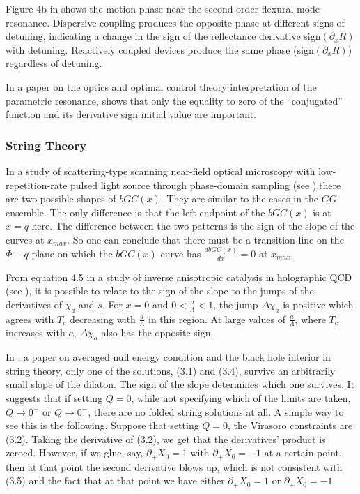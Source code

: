 \documentclass[11pt]{book}
\begin{document}
Figure 4b in \cite{roxworthy2018electrically} shows the motion phase
near the second-order flexural mode resonance. Dispersive coupling
produces the opposite phase at different signs of detuning, indicating
a change in the sign of the reflectance derivative $\text{sign}\left(\partial_{x}R\right)$
with detuning. Reactively coupled devices produce the same phase ($\text{sign}\left(\partial_{x}R\right)$)
regardless of detuning.

In a paper on the optics and optimal control theory interpretation of
the parametric resonance, \cite{schitov2019optics} shows that only the equality to zero of the ``conjugated''
function and its derivative sign initial value are important.


\subsubsection{String Theory}


In a study of scattering-type scanning near-field optical
microscopy with low-repetition-rate pulsed light source through phase-domain sampling (see \cite{xiao2015phase}),there are two possible shapes of $bGC\left(x\right)$.
They are similar to the cases in the $GG$ ensemble. The only difference
is that the left endpoint of the $bGC\left(x\right)$ is at $x=q$
here. The difference between the two patterns is the sign of the slope
of the curves at $x_{max}$. So one can conclude that there must be
a transition line on the $\Phi-q$ plane on which the $bGC\left(x\right)$
curve has $\frac{dbGC\left(x\right)}{dx}=0$ at $x_{max}$.

From equation 4.5 in a study of inverse anisotropic catalysis in holographic QCD (see \cite{gursoy2019inverse}), it is possible to
relate to the sign of the slope to the jumps of the derivatives of
$\chi_{a}$ and $s$. For $x=0$ and $0<\frac{a}{\Lambda}<1$, the
jump $\Delta\chi_{a}$ is positive which agrees with $T_{c}$ decreasing
with $\frac{a}{\Lambda}$ in this region. At large values of $\frac{a}{\Lambda}$,
where $T_{c}$ increases with $a$, $\Delta\chi_{a}$ also has the
opposite sign.

In \cite{attali2019averaged}, a paper on averaged null energy condition and the black
hole interior in string theory, only one of the solutions, (3.1) and
(3.4), survive an arbitrarily small slope of the dilaton. The sign
of the slope determines which one survives. It suggests that if setting
$Q=0$, while not specifying which of the limits are taken, $Q\rightarrow0^{+}$
or $Q\rightarrow0^{-}$, there are no folded string solutions at all.
A simple way to see this is the following. Suppose that setting $Q=0$,
the Virasoro constraints are (3.2). Taking the derivative of (3.2),
we get that the derivatives' product is zeroed. However, if we glue,
say, $\partial_{+}X_{0}=1$ with $\partial_{+}X_{0}=-1$ at a certain
point, then at that point the second derivative blows up, which is
not consistent with (3.5) and the fact that at that point we have
either $\partial_{+}X_{0}=1$ or $\partial_{+}X_{0}=-1$.
\end{document}

